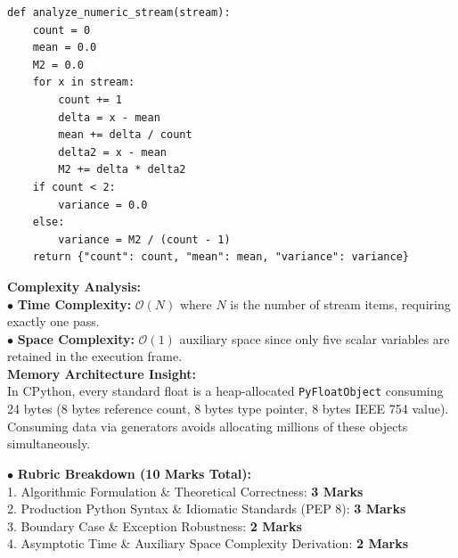 \begin{solbox}
\begin{lstlisting}
def analyze_numeric_stream(stream):
    count = 0
    mean = 0.0
    M2 = 0.0
    for x in stream:
        count += 1
        delta = x - mean
        mean += delta / count
        delta2 = x - mean
        M2 += delta * delta2
    if count < 2:
        variance = 0.0
    else:
        variance = M2 / (count - 1)
    return {"count": count, "mean": mean, "variance": variance}
\end{lstlisting}
\textbf{Complexity Analysis:}\\
$\bullet$ \textbf{Time Complexity:} $\mathcal{O}(N)$ where $N$ is the number of stream items, requiring exactly one pass.\\
$\bullet$ \textbf{Space Complexity:} $\mathcal{O}(1)$ auxiliary space since only five scalar variables are retained in the execution frame.\\
\textbf{Memory Architecture Insight:}\\
In CPython, every standard float is a heap-allocated \texttt{PyFloatObject} consuming 24 bytes (8 bytes reference count, 8 bytes type pointer, 8 bytes IEEE 754 value). Consuming data via generators avoids allocating millions of these objects simultaneously.
\end{solbox}

\begin{examinertip}
$\bullet$ \textbf{Rubric Breakdown (10 Marks Total):}\\
1. Algorithmic Formulation \& Theoretical Correctness: \textbf{3 Marks}\\
2. Production Python Syntax \& Idiomatic Standards (PEP 8): \textbf{3 Marks}\\
3. Boundary Case \& Exception Robustness: \textbf{2 Marks}\\
4. Asymptotic Time \& Auxiliary Space Complexity Derivation: \textbf{2 Marks}
\end{examinertip}
